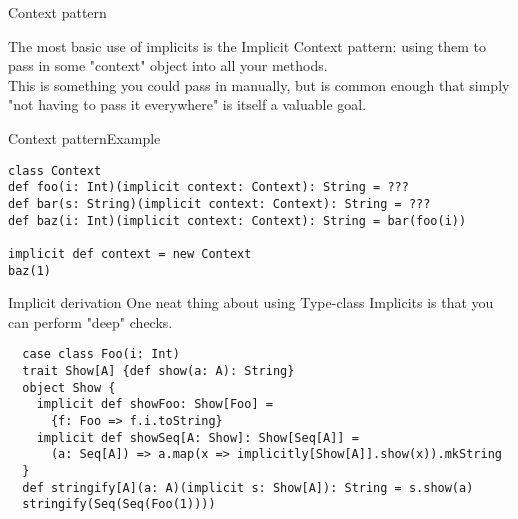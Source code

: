 \documentclass[aspectratio=169]{beamer}
\begin{document}
\begin{frame}{Context pattern}
  \begin{block}{}
    The most basic use of implicits is the Implicit Context pattern: using them to pass in some
    "context" object into all your methods.\\This is something you could pass in manually, but is
    common enough that simply "not having to pass it everywhere" is itself a valuable goal.
  \end{block}
\end{frame}

\begin{frame}[fragile]{Context pattern}{Example}
\begin{verbatim}
class Context
def foo(i: Int)(implicit context: Context): String = ???
def bar(s: String)(implicit context: Context): String = ???
def baz(i: Int)(implicit context: Context): String = bar(foo(i))

implicit def context = new Context
baz(1)
\end{verbatim}
\end{frame}


\begin{frame}[fragile]{Implicit derivation}
One neat thing about using Type-class Implicits is that you can perform "deep" checks.
\begin{verbatim}
  case class Foo(i: Int)
  trait Show[A] {def show(a: A): String}
  object Show {
    implicit def showFoo: Show[Foo] =
      {f: Foo => f.i.toString}
    implicit def showSeq[A: Show]: Show[Seq[A]] =
      (a: Seq[A]) => a.map(x => implicitly[Show[A]].show(x)).mkString
  }
  def stringify[A](a: A)(implicit s: Show[A]): String = s.show(a)
  stringify(Seq(Seq(Foo(1))))
\end{verbatim}
\end{frame}


\end{document}
